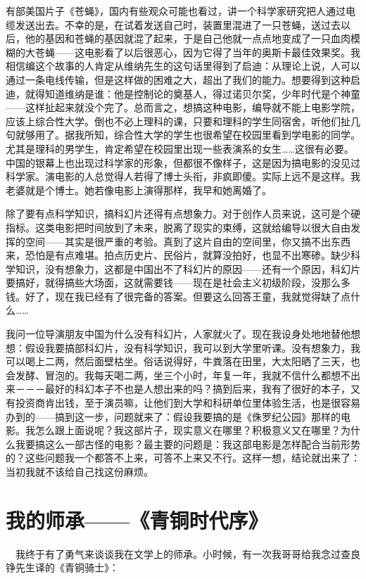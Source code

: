 有部美国片子《苍蝇》，国内有些观众可能也看过，讲一个科学家研究把人通过电缆发送出去。不幸的是，在试着发送自己时，装置里混进了一只苍蝇，送过去以后，他的基因和苍蝇的基因就混了起来，于是自己他就一点点地变成了一只血肉模糊的大苍蝇——这电影看了以后很恶心，因为它得了当年的奥斯卡最佳效果奖。我相信编这个故事的人肯定从维纳先生的这句话里得到了启迪：从理论上说，人可以通过一条电线传输，但是这样做的困难之大，超出了我们的能力。想要得到这种启迪，就得知道维纳是谁：他是控制论的奠基人，得过诺贝尔奖，少年时代是个神童——这样扯起来就没个完了。总而言之，想搞这种电影，编导就不能上电影学院，应该上综合性大学。倒也不必上理科的课，只要和理科的学生同宿舍，听他们扯几句就够用了。据我所知，综合性大学的学生也很希望在校园里看到学电影的同学。尤其是理科的男学生，肯定希望在校园里出现一些表演系的女生……这很有必要。中国的银幕上也出现过科学家的形象，但都很不像样子，这是因为搞电影的没见过科学家。演电影的人总觉得人若得了博士头衔，非疯即傻。实际上远不是这样。我老婆就是个博士。她若像电影上演得那样，我早和她离婚了。 

除了要有点科学知识，搞科幻片还得有点想象力。对于创作人员来说，这可是个硬指标。这类电影把时间放到了未来，脱离了现实的束缚，这就给编导以很大自由发挥的空间——其实是很严重的考验。真到了这片自由的空间里，你又搞不出东西来，恐怕是有点难堪。拍点历史片、民俗片，就算没拍好，也显不出寒碜。缺少科学知识，没有想象力，这都是中国出不了科幻片的原因——还有一个原因，科幻片要搞好，就得搞些大场面，这就需要钱——现在是社会主义初级阶段，没那么多钱。好了，现在我已经有了很完备的答案。但要这么回答王童，我就觉得缺了点什么…… 

我问一位导演朋友中国为什么没有科幻片，人家就火了。现在我设身处地地替他想想：假设我要搞部科幻片，没有科学知识，我可以到大学里听课。没有想象力，我可以喝上二两，然后面壁枯坐。俗话说得好，牛粪落在田里，大太阳晒了三天，也会发酵、冒泡的。我每天喝二两，坐三个小时，年复一年，我就不信什么都想不出来－－－最好的科幻本子不也是人想出来的吗？搞到后来，我有了很好的本子，又有投资商肯出钱，至于演员嘛，让他们到大学和科研单位里体验生活，也是很容易办到的——搞到这一步，问题就来了：假设我要搞的是《侏罗纪公园》那样的电影。我怎么跟上面说呢？我这部片子，现实意义在哪里？积极意义又在哪里？为什么我要搞这么一部古怪的电影？最主要的问题是：我这部电影是怎样配合当前形势的？这些问题我一个都答不上来，可答不上来又不行。这样一想，结论就出来了：当初我就不该给自己找这份麻烦。
 
\chapter{我的师承——《青铜时代序》} 

　我终于有了勇气来谈谈我在文学上的师承。小时候，有一次我哥哥给我念过查良铮先生译的《青铜骑士》：　 


